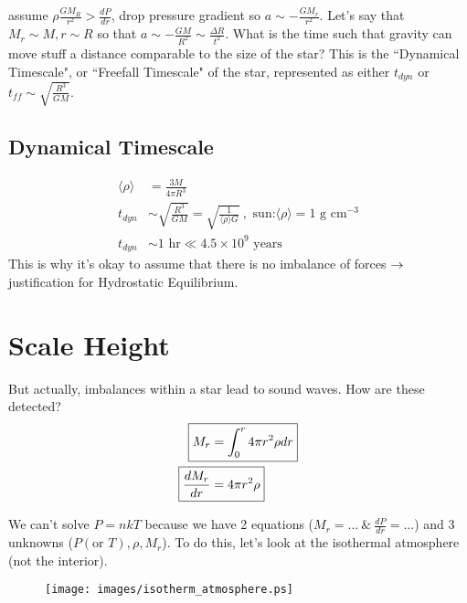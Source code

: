 assume $\rho\frac{GM_R}{r^2} > \frac{dP}{dr}$, drop pressure gradient so $a \sim -\frac{GM_r}{r^2}$. Let's say that $M_r \sim M, r\sim R$ so that $a \sim -\frac{GM}{R^2} \sim \frac{\Delta R}{t^2}$. What is the time such that gravity can move stuff a distance comparable to the size of the star? This is the ``Dynamical Timescale", or ``Freefall Timescale" of the star, represented as either $t_{dyn}$ or $t_{ff} \sim \sqrt{\frac{R^3}{GM}}$.

\subsection{Dynamical Timescale}
\begin{align}
\langle \rho \rangle &= \frac{3M}{4\pi R^3}\\
t_{dyn} &\sim \sqrt{\frac{R^3}{GM}} = \sqrt{\frac{1}{\langle \rho \rangle G}}~,\textrm{ sun:}\langle \rho \rangle = 1\textrm{ g cm}^{-3}\\
t_{dyn} &\sim 1\textrm{ hr}\ll 4.5 \times 10^9\textrm{ years}
\end{align}
This is why it's okay to assume that there is no imbalance of forces $\rightarrow$ justification for Hydrostatic Equilibrium. 

\section{Scale Height}
But actually, imbalances within a star lead to sound waves. How are these detected?
\begin{align}
\Aboxed{M_r &= \int_0^r 4 \pi r^2 \rho dr}\\
\Aboxed{\frac{dM_r}{dr} &= 4\pi r^2\rho}
\end{align}

We can't solve $P = nkT$ because we have 2 equations ($M_r = ...~ \&~ \frac{dP}{dr} = ...$) and 3 unknowns ($P(\textrm{or }T),\rho,M_r$). To do this, let's look at the isothermal atmosphere (not the interior).\\

\begin{figure}[!ht]
\centering
\texttt{[image: images/isotherm\_atmosphere.ps]}
\label{fig:atmosphere}
\end{figure}

